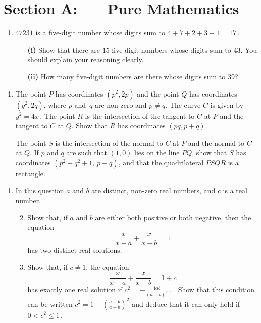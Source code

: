 \documentclass[a4, 11pt]{report}
\newlength{\qspace}
\newcounter{qnumber}
\newenvironment{question}%
 {\vspace{\qspace}
  \begin{enumerate}[\bfseries 1\quad][10]%
    \setcounter{enumi}{\value{qnumber}}%
    \item%
 }
{
  \end{enumerate}
  \filbreak
  \stepcounter{qnumber}
 }
\newenvironment{questionparts}[1][1]%
 {
  \begin{enumerate}[\bfseries (i)]%
    \setcounter{enumii}{#1}
    \addtocounter{enumii}{-1}
    \setlength{\itemsep}{5mm}
    \setlength{\parskip}{8pt}
 }
 {
  \end{enumerate}
 }
\def\le{\leqslant}
\def\l{\left(}
\def\r{\right)}
\begin{document}
\setcounter{page}{2}

 
\section*{Section A: \ \ \ Pure Mathematics}

\begin{question}
$47231$ is a five-digit number whose digits sum to $4+7+2+3+1 = 17\,$.
\begin{itemize}
 \setlength{\itemsep}{3mm}
\item[\bf (i)] Show that there are $15$ five-digit numbers whose digits sum to $43$. 
You should explain  your reasoning clearly.
\item[\bf (ii)] How many five-digit numbers are there whose digits sum to $39$?
\end{itemize}
\end{question}

\begin{question}
The point $P$ has coordinates $\l p^2  ,  2p \r$ 
and the point $Q$ has coordinates $\l q^2  ,  2q \r$, 
where $p$ and~$q$ are non-zero and $p \neq q$. 
The curve $C$ is given by  $y^2 = 4x\,$.
The point $R$ is the intersection of the tangent to $C$  at $P$ 
and the tangent 
to $C$ at $Q$. 
Show that $R$ has coordinates $\l pq ,  p+q \r$.


The point $S$ is the intersection of the normal to $C$ at $P$ 
and the normal to $C$ at $Q$. 
If $p$ and $q$ are such  that $\l 1  ,  0 \r$ 
lies on the line $PQ$, 
show that $S$ has coordinates $\l p^2 + q^2 + 1  , \, p+q \r$, 
and that the quadrilateral $PSQR$ is a rectangle.
\end{question}

\begin{question}
In this question $a$ and $b$ are distinct, 
non-zero real numbers, and $c$ is a real number.
\begin{questionparts}
\item Show that, if $a$ and $b$ are 
either both positive or both negative, then the equation 
\[
\displaystyle \frac {x }{ x-a} + \frac{x }{ x-b} = 1
\]
has two distinct real solutions.
\item Show that, if $c\ne1$, the equation 
\[\displaystyle \frac x { x-a} + \frac{x}{ x-b} = 1 + c\] 
has exactly one real solution if 
$
\displaystyle c^2 = - \frac {4ab}{\l a - b \r ^2}\;. \;\;
$
Show that
this condition can be written $\displaystyle
c^2= 1 - \l \frac {a+b}{a-b} \r ^2 $
and deduce that it  can only hold if $0 < c^2 \le 1\,$.
\end{questionparts}
\end{question}
\end{document}
